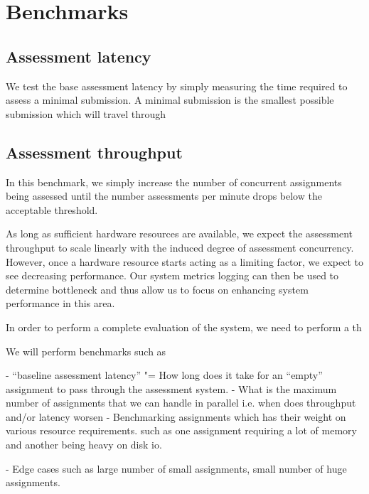\section{Benchmarks}

\subsection{Assessment latency}

We test the base assessment latency by simply measuring the time
required to assess a minimal submission. A minimal submission is the
smallest possible submission which will travel through 

\subsection{Assessment throughput}
In this benchmark, we simply increase the number of concurrent
assignments being assessed until the number assessments per minute
drops below the acceptable threshold.

As long as sufficient hardware resources are available, we expect the
assessment throughput to scale linearly with the induced degree of
assessment concurrency. However, once a hardware resource starts
acting as a limiting factor, we expect to see decreasing
performance. Our system metrics logging can then be used to determine
bottleneck and thus allow us to focus on enhancing system performance
in this area.

In order to perform a complete evaluation of the system, we need to
perform a th

We will perform benchmarks such as

 - "`baseline assessment latency"' "= How long does it take for an
 "`empty"' assignment to pass through the assessment system.
 - What is the maximum number of assignments that we can handle in
 parallel i.e. when does throughput and/or latency worsen
 - Benchmarking assignments which has their weight on various resource
 requirements. such as one assignment requiring a lot of memory and
 another being heavy on disk io.

- Edge cases such as large number of small assignments, small number
of huge assignments. 


